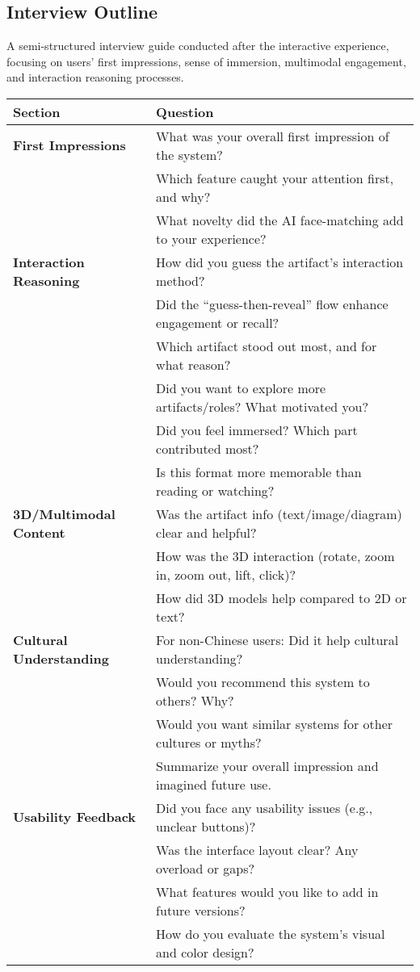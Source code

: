 \subsection{Interview Outline}
A semi-structured interview guide conducted after the interactive experience, focusing on users’ first impressions, sense of immersion, multimodal engagement, and interaction reasoning processes.
\begin{table}[H]
\centering
\begin{tabular}{ll}
\toprule
\textbf{Section} & \textbf{Question} \\
\hline
\textbf{First Impressions} & What was your overall first impression of the system? \\
~ & Which feature caught your attention first, and why? \\
\vspace{0.5em}
~& What novelty did the AI face-matching add to your experience? \\
\textbf{Interaction Reasoning} & How did you guess the artifact's interaction method? \\
~ & Did the “guess-then-reveal” flow enhance engagement or recall? \\
~ & Which artifact stood out most, and for what reason? \\
~ & Did you want to explore more artifacts/roles? What motivated you? \\
~ & Did you feel immersed? Which part contributed most? \\
\vspace{0.5em}
~ & Is this format more memorable than reading or watching? \\
\textbf{3D/Multimodal Content} & Was the artifact info (text/image/diagram) clear and helpful? \\
~ & How was the 3D interaction (rotate, zoom in, zoom out, lift, click)? \\
\vspace{0.5em}
~ & How did 3D models help compared to 2D or text? \\
\textbf{Cultural Understanding} & For non-Chinese users: Did it help cultural understanding? \\
~ & Would you recommend this system to others? Why? \\
~ & Would you want similar systems for other cultures or myths? \\
\vspace{0.5em}
~& Summarize your overall impression and imagined future use. \\
\textbf{Usability Feedback} & Did you face any usability issues (e.g., unclear buttons)? \\
~ & Was the interface layout clear? Any overload or gaps? \\
~ & What features would you like to add in future versions? \\
~ & How do you evaluate the system’s visual and color design? \\

\bottomrule
\end{tabular}
\end{table}

